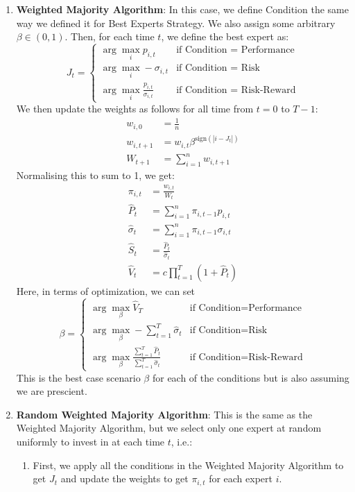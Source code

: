 \documentclass{article}
\begin{document}
\begin{enumerate}
    \item \textbf{Weighted Majority Algorithm}: In this case, we define Condition the same way we defined it for Best Experts Strategy. We also assign some arbitrary $\beta\in(0,1)$. Then, for each time $t$, we define the best expert as: $$J_{t}=\begin{cases}\arg\max_{i}p_{i,t}&\text{if Condition = Performance}\\
        \arg\max_{i}-\sigma_{i,t}&\text{if Condition = Risk}\\
        \arg\max_{i}\frac{p_{i,t}}{\sigma_{i,t}}&\text{if Condition = Risk-Reward}\end{cases}$$
    We then update the weights as follows for all time from $t=0$ to $T-1$:
    $$\begin{align*}w_{i,0}&=\frac{1}{n}\\
        w_{i,t+1}&=w_{i,t}\beta^{\text{sign}(|i-J_{t}|)}\\
        W_{t+1}&=\sum_{i=1}^{n}w_{i,t+1}\end{align*}$$
    Normalising this to sum to 1, we get:
    $$\begin{align*}\pi_{i,t}&=\frac{w_{i,t}}{W_{t}}\\
        \hat{P}_{t}&=\sum_{i=1}^{n}\pi_{i,t-1}p_{i,t}\\
        \hat{\sigma}_{t}&=\sum_{i=1}^{n}\pi_{i,t-1}\sigma_{i,t}\\
        \hat{S}_{t}&=\frac{\hat{P}_{t}}{\hat{\sigma}_{t}}\\
        \hat{V}_{t}&=c\prod_{t=1}^{T}(1+\hat{P}_{t})\end{align*}$$
    Here, in terms of optimization, we can set $$\beta=\begin{cases}\arg\max_{\beta}\hat{V}_{T}&\text{if Condition=Performance}\\
        \arg\max_{\beta}-\sum_{t=1}^{T}\hat{\sigma}_{t}&\text{if Condition=Risk}\\
        \arg\max_{\beta}\frac{\sum_{t=1}^{T}\hat{P}_{t}}{\sum_{t=1}^{T}\hat{\sigma}_{t}}&\text{if Condition=Risk-Reward}\end{cases}$$
    This is the best case scenario $\beta$ for each of the conditions but is also assuming we are prescient.
    \item \textbf{Random Weighted Majority Algorithm}: This is the same as the Weighted Majority Algorithm, but we select only one expert at random uniformly to invest in at each time $t$, i.e.:
    \begin{enumerate}
        \item First, we apply all the conditions in the Weighted Majority Algorithm to get $J_{t}$ and update the weights to get $\pi_{i,t}$ for each expert $i$.

\end{enumerate}
\end{enumerate}
\end{document}
